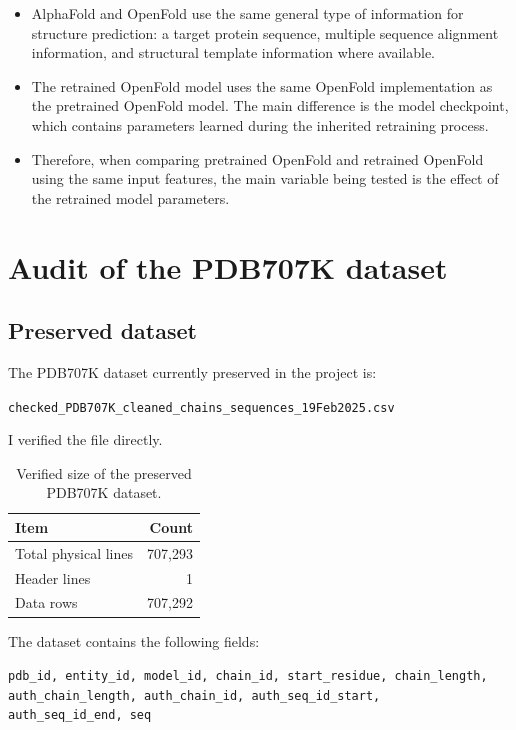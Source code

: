\documentclass[11pt,a4paper]{article}
\begin{document}
\begin{itemize}[leftmargin=*]
    \item AlphaFold and OpenFold use the same general type of information for structure prediction: a target protein sequence, multiple sequence alignment information, and structural template information where available.

    \item The retrained OpenFold model uses the same OpenFold implementation as the pretrained OpenFold model. The main difference is the model checkpoint, which contains parameters learned during the inherited retraining process.

    \item Therefore, when comparing pretrained OpenFold and retrained OpenFold using the same input features, the main variable being tested is the effect of the retrained model parameters.

\end{itemize}


\section{Audit of the PDB707K dataset}

\subsection{Preserved dataset}

The PDB707K dataset currently preserved in the project is:

\begin{center}
\texttt{checked\_PDB707K\_cleaned\_chains\_sequences\_19Feb2025.csv}
\end{center}

I verified the file directly.

\begin{table}[h]
\centering
\begin{tabular}{lr}
\toprule
\textbf{Item} & \textbf{Count} \\
\midrule
Total physical lines & 707,293 \\
Header lines & 1 \\
Data rows & 707,292 \\
\bottomrule
\end{tabular}
\caption{Verified size of the preserved PDB707K dataset.}
\end{table}

The dataset contains the following fields:

\begin{center}
\small
\texttt{pdb\_id, entity\_id, model\_id, chain\_id, start\_residue, chain\_length,}\\
\texttt{auth\_chain\_length, auth\_chain\_id, auth\_seq\_id\_start,}\\
\texttt{auth\_seq\_id\_end, seq}
\end{center}
\end{document}
